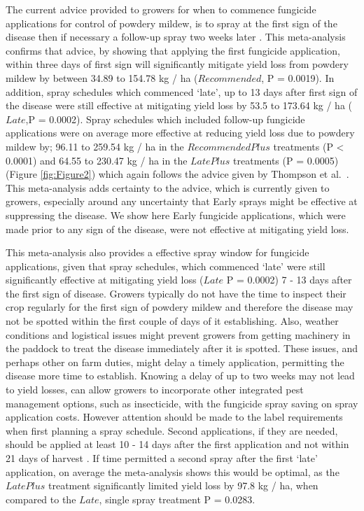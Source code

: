 \documentclass[agronomy,article,submit,moreauthors,pdftex]{mdpi}
\begin{document}
The current advice provided to growers for when to commence fungicide applications for control of powdery mildew, is to spray at the first sign of the disease then if necessary a follow-up spray two weeks later \citep{SueThompson2016, Sparks2017}.
This meta-analysis confirms that advice, by showing that applying the first fungicide application, within three days of first sign will significantly mitigate yield loss from powdery mildew by between 34.89 to 154.78 kg / ha (\(Recommended\), P = 0.0019).
In addition, spray schedules which commenced `late', up to 13 days after first sign of the disease were still effective at mitigating yield loss by 53.5 to 173.64 kg / ha (\(Late\),P = 0.0002).
Spray schedules which included follow-up fungicide applications were on average more effective at reducing yield loss due to powdery mildew by;
96.11 to 259.54 kg / ha in the \(RecommendedPlus\) treatments (P \textless{} 0.0001) and
64.55 to 230.47 kg / ha in the \(LatePlus\) treatments (P = 0.0005) (Figure \ref{fig:Figure2})
which again follows the advice given by Thompson et al.~\citep{SueThompson2016}.
This meta-analysis adds certainty to the advice, which is currently given to growers, especially around any uncertainty that Early sprays might be effective at suppressing the disease.
We show here Early fungicide applications, which were made prior to any sign of the disease, were not effective at mitigating yield loss.

This meta-analysis also provides a effective spray window for fungicide applications, given that spray schedules, which commenced `late' were still significantly effective at mitigating yield loss (\(Late\) P = 0.0002) 7 - 13 days after the first sign of disease.
Growers typically do not have the time to inspect their crop regularly for the first sign of powdery mildew and therefore the disease may not be spotted within the first couple of days of it establishing.
Also, weather conditions and logistical issues might prevent growers from getting machinery in the paddock to treat the disease immediately after it is spotted.
These issues, and perhaps other on farm duties, might delay a timely application, permitting the disease more time to establish.
Knowing a delay of up to two weeks may not lead to yield losses, can allow growers to incorporate other integrated pest management options, such as insecticide, with the fungicide spray saving on spray application costs.
However attention should be made to the label requirements when first planning a spray schedule.
Second applications, if they are needed, should be applied at least 10 - 14 days after the first application and not within 21 days of harvest \citep{APVMAcustodia}.
If time permitted a second spray after the first `late' application, on average the meta-analysis shows this would be optimal, as the \(LatePlus\) treatment significantly limited yield loss by 97.8 kg / ha, when compared to the \(Late\), single spray treatment P = 0.0283.
\end{document}
